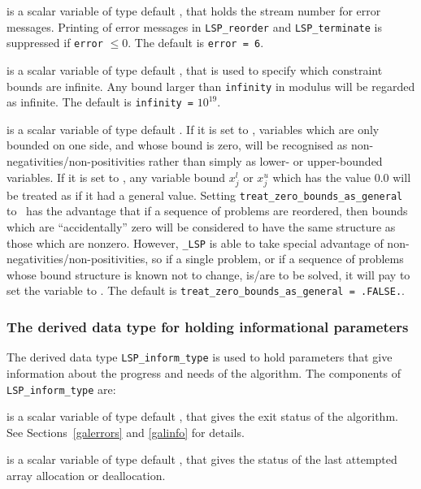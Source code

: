 \documentclass{galahad}
\newcommand{\packagename}{LSP}
\newcommand{\fullpackagename}{\libraryname\_\packagename}
\begin{document}
\begin{description}

 is a scalar variable of type default \integer, that holds the
stream number for error messages. Printing of error messages in 
{\tt \packagename\_reorder} and {\tt \packagename\_terminate} 
is suppressed if {\tt error} $\leq 0$.
The default is {\tt error = 6}.

 is a scalar variable of type default \realdp, that is used to
specify which constraint bounds are infinite.
Any bound larger than {\tt infinity} in modulus will be regarded as infinite.
The default is {\tt infinity =} $10^{19}$.

 is a scalar variable of type 
default \logical.
If it is set to \false, variables which 
are only bounded on one side, and whose bound is zero,
will be recognised as non-negativities/non-positivities rather than simply as
lower- or upper-bounded variables.
If it is set to \true, any variable bound 
$x_{j}^{l}$ or $x_{j}^{u}$ which has the value 0.0 will be
treated as if it had a general value.
Setting {\tt treat\_zero\_bounds\_as\_general} to \true\ has the advantage
that if a sequence of problems are reordered, then bounds which are
``accidentally'' zero will be considered to have the same structure as
those which are nonzero. However, {\tt \fullpackagename} is
able to take special advantage of non-negativities/non-positivities, so
if a single problem, or if a sequence of problems whose 
bound structure is known not to change, is/are to be solved, 
it will pay to set the variable to \false.
The default is {\tt treat\_zero\_bounds\_as\_general = .FALSE.}.

\end{description}


\subsubsection{The derived data type for holding informational
 parameters}\label{typeinform}
The derived data type 
{\tt \packagename\_inform\_type} 
is used to hold parameters that give information about the progress and needs 
of the algorithm. The components of 
{\tt \packagename\_inform\_type} 
are:

\begin{description}

 is a scalar variable of type default \integer, that gives the
exit status of the algorithm. See Sections~\ref{galerrors} and \ref{galinfo}
for details.

 is a scalar variable of type default \integer, that gives
the status of the last attempted array allocation or deallocation.

\end{description}
\end{document}
